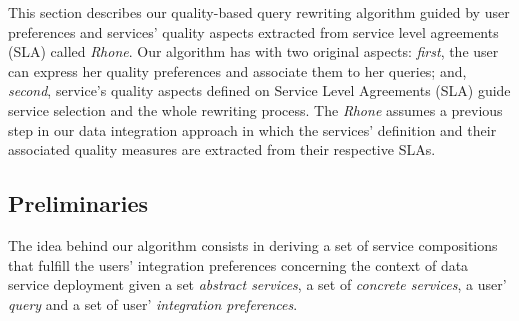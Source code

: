 This section describes our quality-based query rewriting algorithm guided by user preferences and services' quality aspects extracted from service level agreements (SLA) called \textit{Rhone}. Our algorithm has with two original aspects: \textit{first}, the user can express her quality preferences and associate them to her queries; and, \textit{second},  service's quality aspects defined on Service Level Agreements (SLA) guide service selection and  the whole rewriting process. The \textit{Rhone} assumes a previous step in our data integration approach in which the services' definition and their associated quality measures are extracted from their respective SLAs.
%

\subsection{Preliminaries}

The idea behind our algorithm consists in deriving a set of service compositions that fulfill the users' integration preferences concerning the context of data service deployment given a set \textit{abstract services}, a set of \textit{concrete services}, a user' \textit{query} and a set of user' \textit{integration preferences}.
%
%
